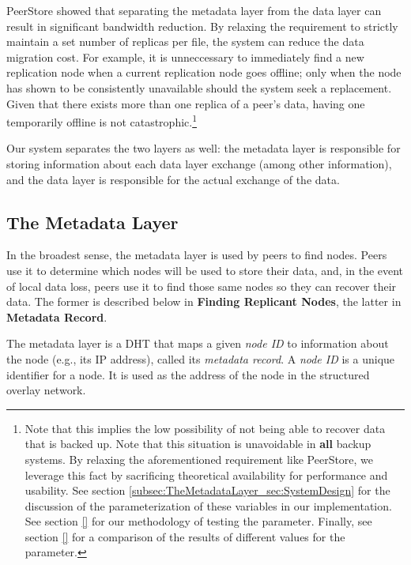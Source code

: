\documentclass[12pt]{report}
\begin{document}
PeerStore showed that separating the metadata layer from the data layer can result in significant bandwidth reduction. By relaxing the requirement to strictly maintain a set number of replicas per file, the system can reduce the data migration cost. For example, it is unneccessary to immediately find a new replication node when a current replication node goes offline; only when the node has shown to be consistently unavailable should the system seek a replacement. Given that there exists more than one replica of a peer's data, having one temporarily offline is not catastrophic.\footnote{Note that this implies the low possibility of not being able to recover data that is backed up. Note that this situation is unavoidable in \textbf{all} backup systems. By relaxing the aforementioned requirement like PeerStore, we leverage this fact by sacrificing theoretical availability for performance and usability. See section \ref{subsec:TheMetadataLayer_sec:SystemDesign} for the discussion of the parameterization of these variables in our implementation. See section \ref{} for our methodology of testing the parameter. Finally, see section \ref{} for a comparison of the results of different values for the parameter.}

Our system separates the two layers as well: the metadata layer is responsible for storing information about each data layer exchange (among other information), and the data layer is responsible for the actual exchange of the data.

\subsection{The Metadata Layer} \label{sec:TheMetadataLayer_DataExchange}

In the broadest sense, the metadata layer is used by peers to find nodes. Peers use it to determine which nodes will be used to store their data, and, in the event of local data loss, peers use it to find those same nodes so they can recover their data. The former is described below in \textbf{Finding Replicant Nodes}, the latter in \textbf{Metadata Record}.

The metadata layer is a DHT that maps a given \textit{node ID} to information about the node (e.g., its IP address), called its \textit{metadata record}. A \textit{node ID} is a unique identifier for a node. It is used as the address of the node in the structured overlay network.
\end{document}
